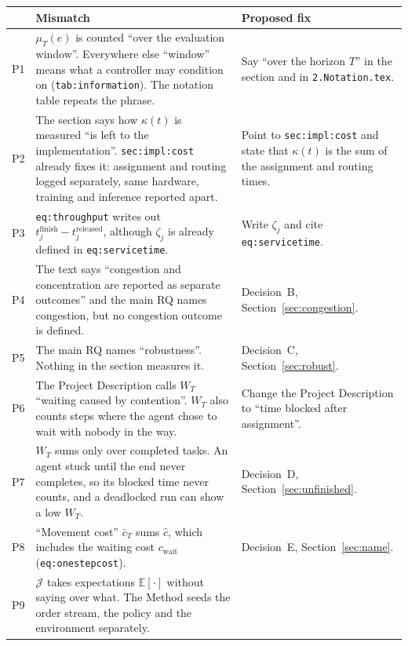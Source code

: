\documentclass[11pt,a4paper]{article}
\begin{document}
\noindent\begin{tabularx}{\linewidth}{@{}lYY@{}}
  \toprule
  & Mismatch & Proposed fix \\
  \midrule
  P1 & $\mu_T(e)$ is counted ``over the evaluation window''. Everywhere
       else ``window'' means what a controller may condition on
       (\texttt{tab:information}). The notation table repeats the phrase.
     & Say ``over the horizon $T$'' in the section and in
       \texttt{2.Notation.tex}. \\
  P2 & The section says how $\kappa(t)$ is measured ``is left to the
       implementation''. \texttt{sec:impl:cost} already fixes it:
       assignment and routing logged separately, same hardware, training
       and inference reported apart.
     & Point to \texttt{sec:impl:cost} and state that $\kappa(t)$ is the
       sum of the assignment and routing times. \\
  P3 & \texttt{eq:throughput} writes out
       $t_j^{\mathrm{finish}} - t_j^{\mathrm{released}}$, although
       $\zeta_j$ is already defined in \texttt{eq:servicetime}.
     & Write $\zeta_j$ and cite \texttt{eq:servicetime}. \\
  P4 & The text says ``congestion and concentration are reported as
       separate outcomes'' and the main RQ names congestion, but no
       congestion outcome is defined.
     & Decision~B, Section~\ref{sec:congestion}. \\
  P5 & The main RQ names ``robustness''. Nothing in the section measures
       it.
     & Decision~C, Section~\ref{sec:robust}. \\
  P6 & The Project Description calls $W_T$ ``waiting caused by
       contention''. $W_T$ also counts steps where the agent chose to
       wait with nobody in the way.
     & Change the Project Description to ``time blocked after
       assignment''. \\
  P7 & $W_T$ sums only over completed tasks. An agent stuck until the end
       never completes, so its blocked time never counts, and a deadlocked
       run can show a low $W_T$.
     & Decision~D, Section~\ref{sec:unfinished}. \\
  P8 & ``Movement cost'' $\bar c_T$ sums $\hat c$, which includes the
       waiting cost $c_{\mathrm{wait}}$ (\texttt{eq:onestepcost}).
     & Decision~E, Section~\ref{sec:name}. \\
  P9 & $\mathcal{J}$ takes expectations $\mathbb{E}[\cdot]$ without saying
       over what. The Method seeds the order stream, the policy and the
       environment separately.

\end{tabularx}
\end{document}
